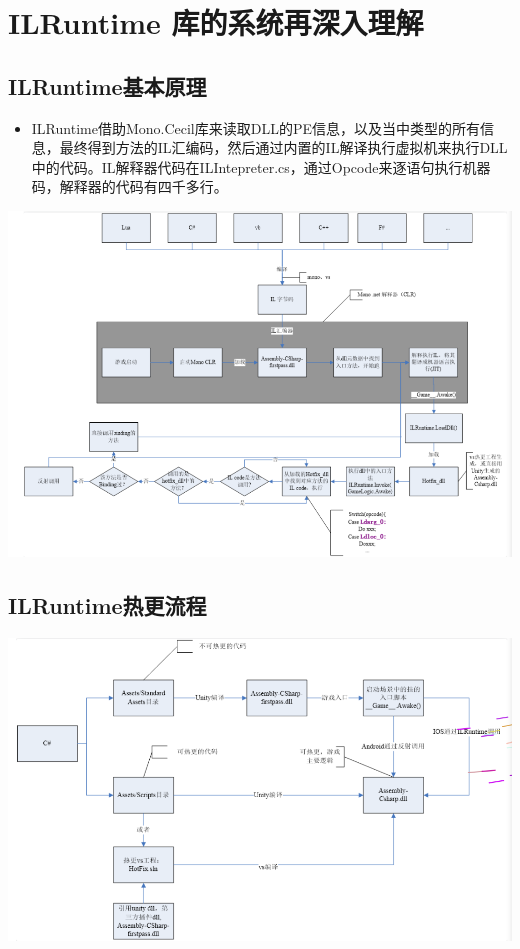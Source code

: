 \documentclass[9pt, b5paper]{article}
\begin{document}
\section{ILRuntime 库的系统再深入理解}
\label{sec-4}
\subsection{ILRuntime基本原理}
\label{sec-4-1}
\begin{itemize}
\item ILRuntime借助Mono.Cecil库来读取DLL的PE信息，以及当中类型的所有信息，最终得到方法的IL汇编码，然后通过内置的IL解译执行虚拟机来执行DLL中的代码。IL解释器代码在ILIntepreter.cs，通过Opcode来逐语句执行机器码，解释器的代码有四千多行。
\end{itemize}

\includegraphics[width=.9\linewidth]{./pic/readme_20220926_094936.png}
\subsection{ILRuntime热更流程}
\label{sec-4-2}

\includegraphics[width=.9\linewidth]{./pic/readme_20220926_095022.png}
\end{document}
